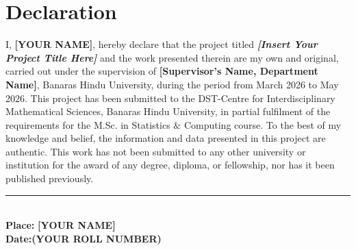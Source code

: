 \vspace{3em}
\section*{\centering \huge Declaration}
\vspace{3em}
\begin{large}
	I, \textbf{[YOUR NAME]}, hereby declare that the project titled \emph{\textbf{[Insert Your Project Title Here]}} and the work presented therein are my own and original, carried out under the supervision of \textbf{[Supervisor’s Name, Department Name]}, Banaras Hindu University, during the period from March 2026 to May 2026. This project has been submitted to the DST-Centre for Interdisciplinary Mathematical Sciences, Banaras Hindu University, in partial fulfilment of the requirements for the M.Sc. in Statistics $\&$ Computing course. To the best of my knowledge and belief, the information and data presented in this project are authentic. This work has not been submitted to any other university or institution for the award of any degree, diploma, or fellowship, nor has it been published previously.
	
	\vspace{5em}
\begin{flushright}
	\rule[.1em]{12em}{1pt}\\
	\textbf{Place:} \hfill \textbf{[YOUR NAME]}\\
	\textbf{Date:}\hfill \textbf{(YOUR ROLL NUMBER)}
\end{flushright}
\clearpage
\end{large}

\newpage

